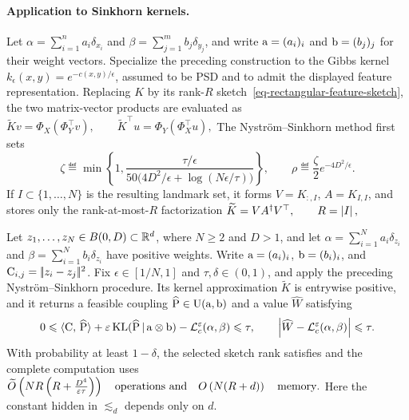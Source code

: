 \paragraph{Application to Sinkhorn kernels.}
Let $\alpha=\sum_{i=1}^n a_i\delta_{x_i}$ and $\beta=\sum_{j=1}^m b_j\delta_{y_j}$, and write $\mathrm{a}=(a_i)_i$ and $\mathrm{b}=(b_j)_j$ for their weight vectors. Specialize the preceding construction to the Gibbs kernel \(k_\epsilon(x,y)=e^{-c(x,y)/\epsilon}\), assumed to be PSD and to admit the displayed feature representation. Replacing \(K\) by its rank-\(R\) sketch~\eqref{eq-rectangular-feature-sketch}, the two matrix-vector products are evaluated as
\(\widetilde K v=\Phi_X(\Phi_Y^\top v), \qquad \widetilde K^\top u=\Phi_Y(\Phi_X^\top u),\)
The Nystr\"om--Sinkhorn method first sets
\[
\zeta\eqdef\min\left\{1,
\frac{\tau/\epsilon}{50\bigl(4D^2/\epsilon+\log(N\epsilon/\tau)\bigr)}\right\},
\qquad
\rho\eqdef\frac{\zeta}{2}e^{-4D^2/\epsilon}.
\]
If \(I\subset\{1,\ldots,N\}\) is the resulting landmark set, it forms \(V=K_{:,I}\), \(A=K_{I,I}\), and stores only the rank-at-most-\(R\) factorization
\(\widetilde K=VA^\dagger V^\top, \qquad R=\left\lvert I\right\rvert,\)
\begin{prop}
\label{prop-gaussian-nystrom-sinkhorn-complexity}
Let \(z_1,\ldots,z_N\in B(0,D)\subset\mathbb{R}^d\), where \(N\geq2\) and \(D>1\), and let \(\alpha=\sum_{i=1}^N a_i\delta_{z_i}\) and \(\beta=\sum_{i=1}^N b_i\delta_{z_i}\) have positive weights. Write \(\mathrm{a}=(a_i)_i\), \(\mathrm{b}=(b_i)_i\), and \(\mathrm{C}_{i,j}=|\!| z_i-z_j |\!|^2\). Fix \(\epsilon\in[1/N,1]\) and \(\tau,\delta\in(0,1)\), and apply the preceding Nystr\"om--Sinkhorn procedure. Its kernel approximation \(\widetilde K\) is entrywise positive, and it returns a feasible coupling \(\widehat{\mathrm{P}}\in\mathrm{U}(\mathrm{a},\mathrm{b})\) and a value \(\widehat W\) satisfying
\[
0\leqslant
\langle \mathrm{C},\,\widehat{\mathrm{P}}\rangle
+\varepsilon\operatorname{KL}(\widehat{\mathrm{P}}\,|\,\mathrm{a}\otimes\mathrm{b})
-\mathcal{L}_c^\varepsilon(\alpha,\beta)
\leqslant\tau,
\qquad
\left\lvert\widehat W-\mathcal{L}_c^\varepsilon(\alpha,\beta)\right\rvert\leqslant\tau.
\]
With probability at least \(1-\delta\), the selected sketch rank satisfies
and the complete computation uses
\(\widetilde O\left(  NR\left( R+\frac{D^4}{\varepsilon\tau} \right)  \right) \quad\text{operations and}\quad O\left( N(R+d) \right) \quad\text{memory}.\)
Here the constant hidden in \(\lesssim_d\) depends only on \(d\).
\end{prop}
